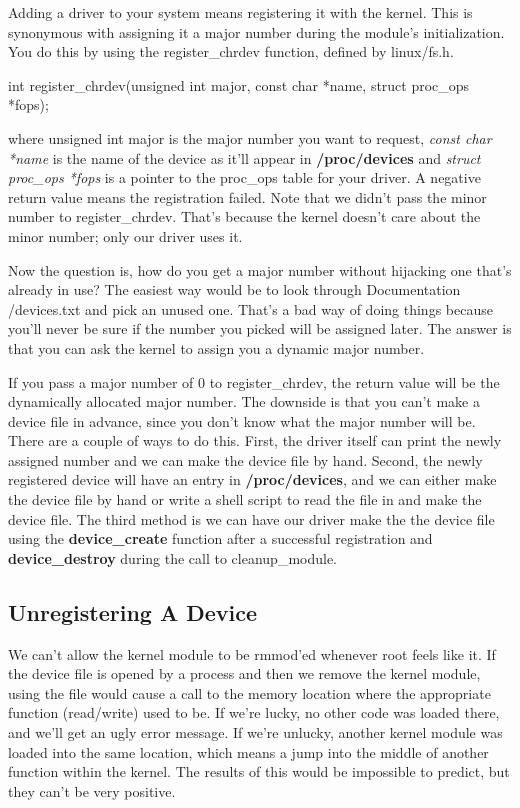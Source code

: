 \documentclass[10pt, oneside]{book}
\begin{document}
Adding a driver to your system means registering it with the kernel. This is synonymous with assigning it a major number during the module's initialization. You do this by using the register\_chrdev function, defined by linux/fs.h.

\begin{code}
int register_chrdev(unsigned int major, const char *name, struct proc_ops *fops);
\end{code}

where unsigned int major is the major number you want to request, \emph{const char *name} is the name of the device as it'll appear in \textbf{/proc/devices} and \emph{struct proc\_ops *fops} is a pointer to the proc\_ops table for your driver. A negative return value means the registration failed. Note that we didn't pass the minor number to register\_chrdev. That's because the kernel doesn't care about the minor number; only our driver uses it.

Now the question is, how do you get a major number without hijacking one that's already in use? The easiest way would be to look through Documentation /devices.txt and pick an unused one. That's a bad way of doing things because you'll never be sure if the number you picked will be assigned later. The answer is that you can ask the kernel to assign you a dynamic major number.

If you pass a major number of 0 to register\_chrdev, the return value will be the dynamically allocated major number. The downside is that you can't make a device file in advance, since you don't know what the major number will be. There are a couple of ways to do this. First, the driver itself can print the newly assigned number and we can make the device file by hand. Second, the newly registered device will have an entry in \textbf{/proc/devices}, and we can either make the device file by hand or write a shell script to read the file in and make the device file. The third method is we can have our driver make the the device file using the \textbf{device\_create} function after a successful registration and \textbf{device\_destroy} during the call to cleanup\_module.

\subsection{Unregistering A Device}
\label{sec:org9c60028}
We can't allow the kernel module to be rmmod'ed whenever root feels like it. If the device file is opened by a process and then we remove the kernel module, using the file would cause a call to the memory location where the appropriate function (read/write) used to be. If we're lucky, no other code was loaded there, and we'll get an ugly error message. If we're unlucky, another kernel module was loaded into the same location, which means a jump into the middle of another function within the kernel. The results of this would be impossible to predict, but they can't be very positive.
\end{document}
